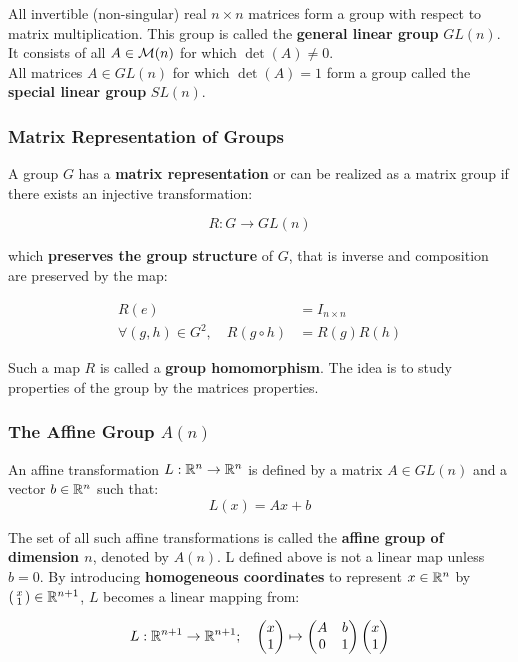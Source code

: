 All invertible (non-singular) real $n \times n$ matrices
form a group with respect to matrix multiplication.
This group is called the \textbf{general linear group} $GL(n)$.
It consists of all $A \in \mathcal{M}(n)$ for which $\det(A) \ne 0$.\\

All matrices $A \in GL(n)$ for which $\det(A) = 1$ form a group
called the \textbf{special linear group} $SL(n)$.


\subsubsection{Matrix Representation of Groups}%
\label{ssub:matrix_representation_of_groups}

A group $G$ has a \textbf{matrix representation} or can be realized as
a matrix group if there exists an injective transformation:

\[R : G \rightarrow GL(n)\]

which \textbf{preserves the group structure} of $G$,
that is inverse and composition are preserved by the map:

\begin{align*}
	R(e) &= I_{n \times n} \\
	\forall (g,h) \in G^2, \quad R(g\circ h) &= R(g)R(h)
\end{align*}

Such a map $R$ is called a \textbf{group homomorphism}.
The idea is to study properties of the group by the matrices properties.


\subsubsection{The Affine Group $A(n)$}%
\label{ssub:the_affine_group_a_n_}

An affine transformation $L : \mathbb{R}^n \rightarrow \mathbb{R}^n$
is defined by a matrix $A \in GL(n)$ and a vector $b \in \mathbb{R}^n$ such that:
\[L(x) = Ax + b\]

The set of all such affine transformations is called the
\textbf{affine group of dimension $n$}, denoted by $A(n)$.
L defined above is not a linear map unless $b=0$.
By introducing \textbf{homogeneous coordinates} to represent $x \in \mathbb{R}^n$ by
$\left(\begin{smallmatrix} x \\ 1 \end{smallmatrix} \right) \in \mathbb{R}^{n+1}$,
$L$ becomes a linear mapping from:

\[L: \mathbb{R}^{n+1} \rightarrow \mathbb{R}^{n+1}; \quad
	\begin{pmatrix}
		x \\
		1 \\
	\end{pmatrix}
	\mapsto
	\begin{pmatrix}
		A & b \\
		0 & 1 \\
	\end{pmatrix}
	\begin{pmatrix}
		x \\
		1 \\
	\end{pmatrix}\]

